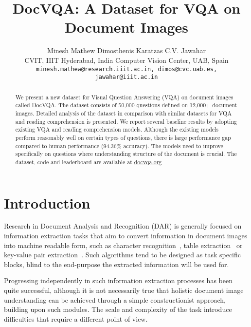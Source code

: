 \documentclass[10pt,twocolumn,letterpaper]{article}
\newcommand{\datasetName}{DocVQA\xspace}
\begin{document}
\title{DocVQA: A Dataset for VQA on Document Images}

\author
{Minesh Mathew   Dimosthenis Karatzas   C.V. Jawahar \\
CVIT, IIIT Hyderabad, India  
Computer Vision Center, UAB, Spain
\\
{\tt\small minesh.mathew@research.iiit.ac.in, dimos@cvc.uab.es, jawahar@iiit.ac.in}
}



\maketitle


\begin{abstract}
We present a new dataset for Visual Question Answering (VQA) on document images called \datasetName. The dataset consists of 50,000 questions defined on 12,000+ document images. Detailed analysis of the dataset in comparison with similar datasets for VQA and reading comprehension is presented. We report several baseline results by adopting existing VQA and reading comprehension models. Although the existing models perform reasonably well on certain types of questions, there is large performance gap compared to human performance (94.36\% accuracy). The models need to improve specifically on questions where understanding structure of the document is crucial. The dataset, code and leaderboard are available at \href{docvqa.org}{docvqa.org}

\end{abstract}

\section{Introduction}

Research in Document Analysis and Recognition (DAR) is generally focused on information extraction tasks that aim to convert information in document images into machine readable form, such as character recognition~\cite{doermann2014handbook}, table extraction~\cite{kavasidis2019saliency} or key-value pair extraction~\cite{palm2017cloudscan}. Such algorithms tend to be designed as task specific blocks, blind to the end-purpose the extracted information will be used for.

Progressing independently in such information extraction processes has been quite successful, although it is not necessarily true that holistic document image understanding can be achieved through a simple constructionist approach, building upon such modules. The scale and complexity of the task introduce difficulties that require a different point of view.
\end{document}
